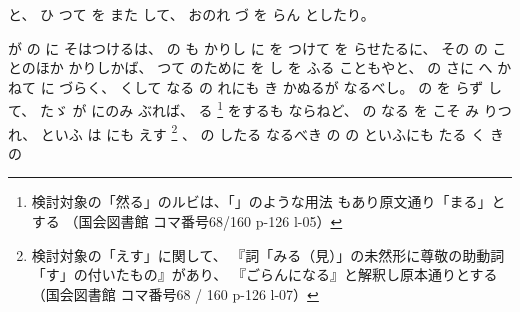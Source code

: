%
と、
%
ひ
つて
を
また
して、
%
おのれ
づ
を
らん
としたり。

%
が
の
に
そはつけるは、
%
の
も%
かりし
に
を
つけて
を
らせたるに、
%
その
の
ことのほか
かりしかば、
%
つて
のために
を
し
%
を
ふる
こともやと、
%
の
さに
へ
かねて
に
づらく、
%
くして
なる
の%
れにも
%
き
かぬるが
なるべし。
%
の%
を
らず
して、
%
たゞ%
が
にのみ
ぶれば、
%
る
\footnote{%
  検討対象の「然る」のルビは、「」のような用法
  もあり原文通り「まる」とする
  （国会図書館 コマ番号68/160 p-126 l-05）
}%
をするも
ならねど、
%
の
なる
を
こそ
み
りつれ、
%
といふ
は
にも
えす
\footnote{%
  検討対象の「えす」に関して、
  『詞「みる（見）」の未然形に尊敬の助動詞「す」の付いたもの』があり、
  『ごらんになる』と解釈し原本通りとする
  （国会図書館 コマ番号68 / 160 p-126 l-07）
}%
、
%
の
したる
なるべき
の
の
といふにも
たる
く
き
の
